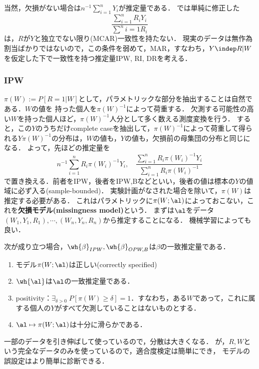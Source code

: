 \documentclass[uplatex,dvipdfmx]{jsreport}
\begin{document}
\begin{discussion}
    当然，欠損がない場合は$n^{-1}\sum^n_{i=1}Y_i$が推定量である．
    では単純に修正した
    \[\frac{\sum^n_{i=1}R_iY_i}{\sum^n{i=1}R_i}\]
    は，$R$が$Y$と独立でない限り(MCAR)一致性を持たない．
    現実のデータは無作為割当ばかりではないので，この条件を弱めて，MAR，すなわち，$Y\indep R|W$を仮定した下で一致性を持つ推定量IPW, RI, DRを考える．
\end{discussion}

\subsubsection{IPW}

$\pi(W):=P[R=1|W]$として，パラメトリックな部分を抽出することは自然である．$W$の値を
持った個人を$\pi(W)^{-1}$によって荷重する．
欠測する可能性の高い$W$を持った個人ほど，$\pi(W)^{-1}$人分として多く数える測度変換を行う．
すると，この$Y$のうちだけcomplete caseを抽出して，$\pi(W)^{-1}$によって荷重して得られる$Y\pi(W)^{-1}$の分布は，$W$の値も，$Y$の値も，欠損前の母集団の分布と同じになる．
よって，先ほどの推定量を
\[n^{-1}\sum^n_{i=1}R_i\pi(W_i)^{-1}Y_i,\quad\frac{\sum^n_{i=1}R_i\pi(W_i)^{-1}Y_i}{\sum^n_{i=1}R_i\pi(W_i)^{-1}}\]
で置き換える．前者をIPW，後者をIPW,Bなどといい，後者の値は標本の$Y$の値域に必ず入る(sample-bounded)．
実験計画がなされた場合を除いて，$\pi(W)$は推定する必要がある．
これはパラメトリックに$\pi(W;\al)$によっておこない，これを\textbf{欠損モデル(missingness model)}という．
まずは$\al$をデータ$(W_1,Y_1,R_1),\cdots,(W_n,Y_n,R_n)$から推定することになる．
機械学習によっても良い．

\begin{theorem}
    次が成り立つ場合，$\wh{\beta}_{IPW},\wh{\beta}_{OPW,B}$は$\beta$の一致推定量である．
    \begin{enumerate}
        \item モデル$\pi(W;\al)$は正しい(correctly specified)
        \item $\wh{\al}$は$\al$の一致推定量である．
        \item positivity：$\exists_{\delta>0}\;P[\pi(W)\ge\delta]=1$．すなわち，ある$W$であって，これに属する個人の$Y$がすべて欠測していることはないものとする．
        \item $\al\mapsto\pi(W;\al)$は十分に滑らかである．
    \end{enumerate}
\end{theorem}

\begin{remark}
    一部のデータを引き伸ばして使っているので，分散は大きくなる．
    が，$R,W$という完全なデータのみを使っているので，適合度検定は簡単にでき，
    モデルの誤設定はより簡単に診断できる．
\end{remark}
\end{document}
